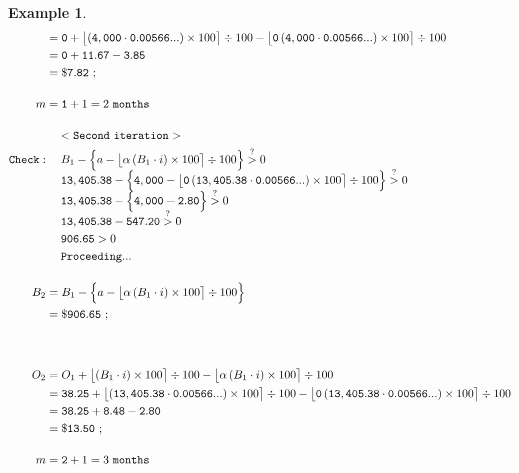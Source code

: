 \documentclass[12pt,letterpaper,oneside]{article}
\newtheorem{example}{Example}[section]
\theoremstyle{remark} %
\begin{document}
\begin{example}
\begin{align*}
	&=\mathtt{\interest}+\big\lfloor{\left(\mathtt{\balance}\cdot \mathtt{\rate}\right)\times 100}\big\rceil\div 100-\big\lfloor{\mathtt{\proportion}\left(\mathtt{\balance}\cdot \mathtt{\rate}\right)\times 100}\big\rceil\div 100\\
	&=\mathtt{\interest}+\mathtt{11.67}-\mathtt{3.85}\\
	&=\mathtt{\$7.82}\ ;\\[12pt]
	m&=\mathtt{\monthsp}+1=2\mathtt{\ months}\\[12pt]
	&\quad\;\mathtt{<Second\ iteration>}\\
	\mathtt{Check:}&\quad\;B_{\monthsitb}-\Big\{a-\big\lfloor{\alpha\left(B_{\monthsitb}\cdot i\right)\times 100}\big\rceil\div 100\Big\}\overset{?}{>}0\\[-6pt]
	&\quad\;\mathtt{\balanceitb}-\Big\{\mathtt{\amount}-\big\lfloor{\mathtt{\proportion}\left(\mathtt{\balanceitb}\cdot \mathtt{\rate}\right)\times 100}\big\rceil\div 100\Big\}\overset{?}{>}0\\[-6pt]
	&\quad\;\mathtt{\balanceitb}-\Big\{\mathtt{\amount}-\mathtt{2.80}\Big\}\overset{?}{>}0\\[-6pt]
	&\quad\;\mathtt{\balanceitb}-\mathtt{547.20}\overset{?}{>}0\\
	&\quad\;\mathtt{906.65}>0\\
	&\quad\;\mathtt{Proceeding...}\\[12pt]
	B_{\monthspitb}&=B_{\monthsitb}-\Big\{a-\big\lfloor{\alpha\left(B_{\monthsitb}\cdot i\right)\times 100}\big\rceil\div 100\Big\}\\
	&=\mathtt{\$906.65}\ ;\\[36pt] %
	O_{\monthspitb}&=O_{\monthsitb}+\big\lfloor{\left(B_{\monthsitb}\cdot i\right)\times 100}\big\rceil\div 100-\big\lfloor{\alpha\left(B_{\monthsitb}\cdot i\right)\times 100}\big\rceil\div 100\\
	&=\mathtt{\interestitb}+\big\lfloor{\left(\mathtt{\balanceitb}\cdot \mathtt{\rate}\right)\times 100}\big\rceil\div 100-\big\lfloor{\mathtt{\proportion}\left(\mathtt{\balanceitb}\cdot \mathtt{\rate}\right)\times 100}\big\rceil\div 100\\
	&=\mathtt{\interestitb}+\mathtt{8.48}-\mathtt{2.80}\\
	&=\mathtt{\$13.50}\ ;\\[12pt]
	m&=\mathtt{\monthspitb}+1=3\mathtt{\ months}\\[12pt]

\end{align*}
\end{example}
\end{document}
